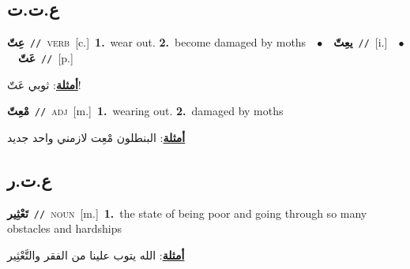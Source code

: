 \documentclass[10pt,a4paper,twoside]{article} %
\begin{document}
\begin{multicols}{2}
{{{{{{{{{\vspace{-3mm}
\subsection*{\color{blue}\foreignlanguage{arabic}{ع.ت.ت}\color{blue}{}} 

{\setlength\topsep{0pt}\textbf{\foreignlanguage{arabic}{عِتّ}}\ {\color{gray}\texttt{//}\color{black}}\ \textsc{verb}\ [c.]\ \textbf{1.}~wear out.  \textbf{2.}~become damaged by moths\ \ $\bullet$\ \ \setlength\topsep{0pt}\textbf{\foreignlanguage{arabic}{يعِتّ}}\ {\color{gray}\texttt{//}\color{black}}\ [i.]\ \ $\bullet$\ \ \setlength\topsep{0pt}\textbf{\foreignlanguage{arabic}{عَتّ}}\ {\color{gray}\texttt{//}\color{black}}\ [p.]\  \begin{flushright}\color{gray}\foreignlanguage{arabic}{\textbf{\underline{\foreignlanguage{arabic}{أمثلة}}}: ثوبي عَتّ!}\end{flushright}\color{black}} \vspace{2mm}

{\setlength\topsep{0pt}\textbf{\foreignlanguage{arabic}{مْعِتّ}}\ {\color{gray}\texttt{//}\color{black}}\ \textsc{adj}\ [m.]\ \textbf{1.}~wearing out.  \textbf{2.}~damaged by moths\  \begin{flushright}\color{gray}\foreignlanguage{arabic}{\textbf{\underline{\foreignlanguage{arabic}{أمثلة}}}: البنطلون مْعِت لازمني واحد جديد}\end{flushright}\color{black}} \vspace{2mm}

\vspace{-3mm}
\subsection*{\color{blue}\foreignlanguage{arabic}{ع.ت.ر}\color{blue}{}} 

{\setlength\topsep{0pt}\textbf{\foreignlanguage{arabic}{تَعْثِير}}\ {\color{gray}\texttt{//}\color{black}}\ \textsc{noun}\ [m.]\ \textbf{1.}~the state of being poor and going through so many obstacles and hardships\  \begin{flushright}\color{gray}\foreignlanguage{arabic}{\textbf{\underline{\foreignlanguage{arabic}{أمثلة}}}: الله يتوب علينا من الفقر والتَّعْثِير}\end{flushright}\color{black}} \vspace{2mm}

}}}}}}}}}
\end{multicols}
\end{document}
